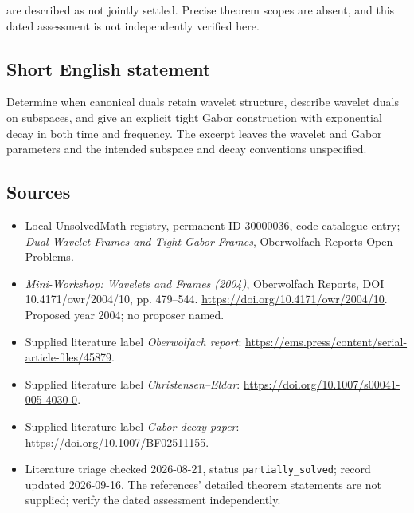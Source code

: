 \documentclass[11pt]{article}
\begin{document}
are described as not jointly settled. Precise theorem scopes are absent, and this dated assessment is not independently verified here.
\subsection{Short English statement}
Determine when canonical duals retain wavelet structure, describe wavelet duals on subspaces, and give an explicit tight Gabor construction with exponential decay in both time and frequency. The excerpt leaves the wavelet and Gabor parameters and the intended subspace and decay conventions unspecified.
\subsection{Sources}
\begin{itemize}\item Local UnsolvedMath registry, permanent ID 30000036, code catalogue entry; \emph{Dual Wavelet Frames and Tight Gabor Frames}, Oberwolfach Reports Open Problems.\item \emph{Mini-Workshop: Wavelets and Frames (2004)}, Oberwolfach Reports, DOI 10.4171/owr/2004/10, pp. 479--544. \url{https://doi.org/10.4171/owr/2004/10}. Proposed year 2004; no proposer named.\item Supplied literature label \emph{Oberwolfach report}: \url{https://ems.press/content/serial-article-files/45879}.\item Supplied literature label \emph{Christensen--Eldar}: \url{https://doi.org/10.1007/s00041-005-4030-0}.\item Supplied literature label \emph{Gabor decay paper}: \url{https://doi.org/10.1007/BF02511155}.\item Literature triage checked 2026-08-21, status \texttt{partially\_solved}; record updated 2026-09-16. The references' detailed theorem statements are not supplied; verify the dated assessment independently.\end{itemize}
\end{document}
